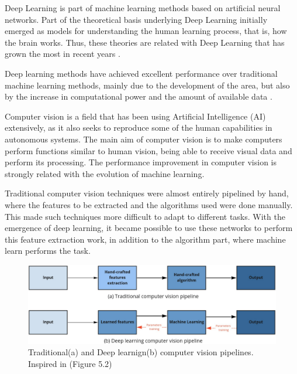  Deep Learning is part of machine learning methods based on artificial neural networks. %
 Part of the theoretical basis underlying Deep Learning  initially emerged as models for understanding the human learning process, that is, how the brain works. Thus, these theories are related with Deep Learning  that has grown the most in recent years \cite{goodfellow2016}.

Deep learning methods have achieved excellent performance over traditional machine learning methods, mainly due to the development of the area, but also by the increase in computational power and the amount of available data \cite{geron2019}. 

Computer vision is a field that has been using Artificial Intelligence (AI) extensively, as it also seeks to reproduce some of the human capabilities in autonomous systems. The main aim of computer vision is to make computers perform functions similar to human vision, being able to receive visual data and perform its processing. The performance improvement in computer vision is strongly related with the evolution of machine learning.

Traditional computer vision techniques were almost entirely pipelined by hand, where the features to be extracted and the algorithms used were done manually. This made such techniques more difficult to adapt to different tasks. With the emergence of deep learning, it became possible to use these networks to perform this feature extraction work, in addition to the algorithm part, where machine learn performs the task.

\begin{figure}
    \centering
    \includegraphics[scale=0.20]{"Part 3 - Learning Systems/Supervised Learning/Deep Learning/images/cvpipeline.png"}
    \caption{Traditional(a) and Deep learnign(b) computer vision pipelines. Inspired in \cite{szeliski2010computer}(Figure 5.2)}
    \label{fig:figurecvpipeline}
\end{figure}

